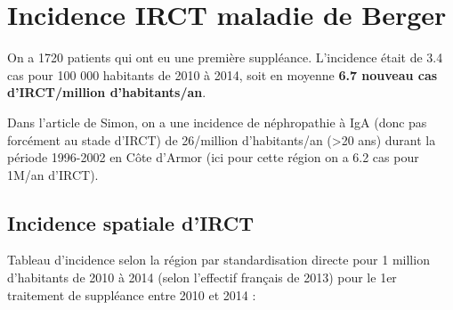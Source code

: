 \documentclass[11pt,a4paper]{article}\usepackage[]{graphicx}\usepackage[]{color}
\begin{document}
\section{Incidence IRCT maladie de Berger}



On a 1720 patients qui ont eu une première suppléance. L'incidence était de 3.4 cas pour 100 000 habitants de 2010 à 2014, soit en moyenne \textbf{6.7 nouveau cas d'IRCT/million d'habitants/an}. 

Dans l'article de Simon, on a une incidence de néphropathie à IgA (donc pas forcément au stade d'IRCT) de 26/million d'habitants/an (\textgreater 20 ans) durant la période 1996-2002 en Côte d'Armor (ici pour cette région on a 6.2 cas pour 1M/an d'IRCT). %

  \subsection{Incidence spatiale d'IRCT}

Tableau d'incidence selon la région par standardisation directe pour 1 million d'habitants de 2010 à 2014 (selon l'effectif français de 2013) pour le 1er traitement de suppléance entre 2010 et 2014 :
\end{document}
